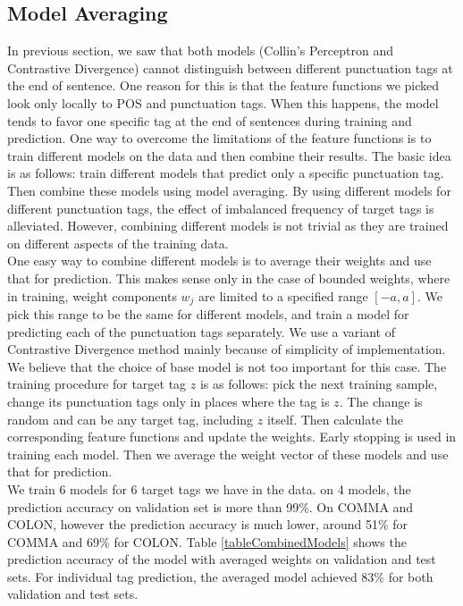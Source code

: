\documentclass[twoside,12pt]{article}
\begin{document}
\subsection{Model Averaging}
In previous section, we saw that both models (Collin's Perceptron and Contrastive Divergence) cannot distinguish between different punctuation tags at the end of sentence.  One reason for this is that the feature functions we picked look only locally to POS and punctuation tags. When this happens, the model tends to favor one specific tag at the end of sentences during training and prediction. One way to overcome the limitations of the feature functions is to train different models on the data and then combine their results. The basic idea is as follows: train different models that predict only a specific punctuation tag. Then combine these models using model averaging. By using different models for different punctuation tags, the effect of imbalanced frequency of target tags is alleviated. However, combining different models is not trivial as they are trained on different aspects of the training data.\\
One easy way to combine different models is to average their weights and use that for prediction. This makes sense only in the case of bounded weights, where in training, weight components $w_j$ are limited to a specified range $[-a,a]$. We pick this range to be the same for different models, and train a model for predicting each of the punctuation tags separately. We use a variant of Contrastive Divergence method mainly because of simplicity of implementation. We believe that the choice of base model is not too important for this case. The training procedure for target tag $z$ is as follows: pick the next training sample, change its punctuation tags only in places where the tag is $z$. The change is random and can be any target tag, including $z$ itself. Then calculate the corresponding feature functions and update the weights. Early stopping is used in training each model. Then we average the weight vector of these models and use that for prediction.\\
We train 6 models for 6 target tags we have in the data. on 4 models, the prediction accuracy on validation set is more than 99\%. On COMMA and COLON, however the prediction accuracy is much lower, around 51\% for COMMA and 69\% for COLON. Table \ref{tableCombinedModels} shows the prediction accuracy of the model with averaged weights on validation and test sets. For individual tag prediction, the averaged model achieved 83\% for both validation and test sets.
\end{document}
